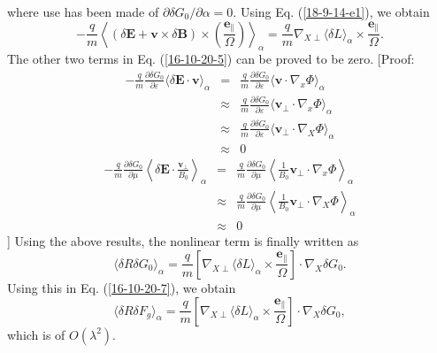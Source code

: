 \documentclass{article}
\newcommand{\tmmathbf}[1]{\ensuremath{\boldsymbol{#1}}}
\begin{document}
where use has been made of $\partial \delta G_0 / \partial \alpha = 0$. Using
Eq. (\ref{18-9-14-e1}), we obtain
\begin{equation}
  - \frac{q}{m} \left\langle (\delta \mathbf{E}+\mathbf{v} \times \delta
  \mathbf{B}) \times \left( \frac{\tmmathbf{e}_{\parallel}}{\Omega}  \right)
  \right\rangle_{\alpha} = \frac{q}{m} \nabla_{X \perp} \langle \delta L
  \rangle_{\alpha} \times \frac{\tmmathbf{e}_{\parallel}}{\Omega} .
\end{equation}
The other two terms in Eq. (\ref{16-10-20-5}) can be proved to be zero.
[Proof:
\begin{eqnarray}
  - \frac{q}{m}  \frac{\partial \delta G_0}{\partial \varepsilon} \langle
  \delta \mathbf{E} \cdot \mathbf{v} \rangle_{\alpha} & = & \frac{q}{m} 
  \frac{\partial \delta G_0}{\partial \varepsilon} \langle \mathbf{v} \cdot
  \nabla_x \Phi \rangle_{\alpha} \nonumber\\
  & \approx & \frac{q}{m}  \frac{\partial \delta G_0}{\partial \varepsilon}
  \langle \mathbf{v}_{\perp} \cdot \nabla_x \Phi \rangle_{\alpha} \nonumber\\
  & \approx & \frac{q}{m}  \frac{\partial \delta G_0}{\partial \varepsilon}
  \langle \mathbf{v}_{\perp} \cdot \nabla_X \Phi \rangle_{\alpha} \nonumber\\
  & \approx & 0 
\end{eqnarray}
\begin{eqnarray}
  - \frac{q}{m}  \frac{\partial \delta G_0}{\partial \mu} \left\langle \delta
  \mathbf{E} \cdot \frac{\mathbf{v}_{\perp}}{B_0} \right\rangle_{\alpha} & = &
  \frac{q}{m}  \frac{\partial \delta G_0}{\partial \mu} \left\langle
  \frac{1}{B_0} \mathbf{v}_{\perp} \cdot \nabla_x \Phi \right\rangle_{\alpha}
  \nonumber\\
  & \approx & \frac{q}{m}  \frac{\partial \delta G_0}{\partial \mu}
  \left\langle \frac{1}{B_0} \mathbf{v}_{\perp} \cdot \nabla_X \Phi
  \right\rangle_{\alpha} \nonumber\\
  & \approx & 0 
\end{eqnarray}
] Using the above results, the nonlinear term is finally written as
\begin{equation}
  \langle \delta R \delta G_0 \rangle_{\alpha} = \frac{q}{m} \left[ \nabla_{X
  \perp} \langle \delta L \rangle_{\alpha} \times
  \frac{\tmmathbf{e}_{\parallel}}{\Omega} \right] \cdot \nabla_X \delta G_0 .
\end{equation}
Using this in Eq. (\ref{16-10-20-7}), we obtain
\begin{equation}
  \langle \delta R \delta F_g \rangle_{\alpha} = \frac{q}{m} \left[ \nabla_{X
  \perp} \langle \delta L \rangle_{\alpha} \times
  \frac{\tmmathbf{e}_{\parallel}}{\Omega} \right] \cdot \nabla_X \delta G_0,
\end{equation}
which is of $O (\lambda^2)$.
\end{document}
